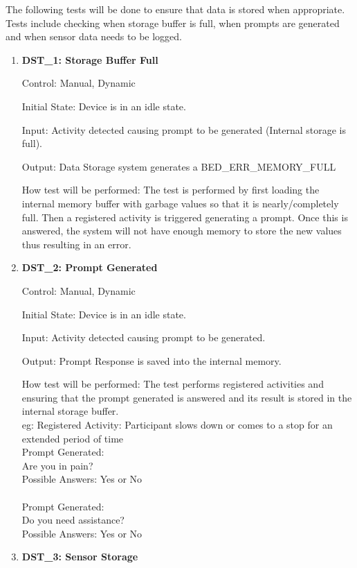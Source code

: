 \documentclass[12pt, titlepage]{article}
\begin{document}
The following tests will be done to ensure that data is stored when appropriate. Tests include checking when storage buffer is full, when prompts are generated and when sensor data needs to be logged. 
\begin{enumerate}
	\item{\textbf{DST\_1: Storage Buffer Full} \\}\label{DST1}
	
		Control: Manual, Dynamic
							
		Initial State: Device is in an idle state.
							
		Input: Activity detected causing prompt to be generated (Internal storage is full).
		
		Output: Data Storage system generates a BED\_ERR\_MEMORY\_FULL
		
		How test will be performed: The test is performed by first loading the internal memory buffer with garbage values so that it is nearly/completely full. Then a registered activity is triggered generating a 					prompt. Once this is answered, the system will not have enough memory to store the new values thus resulting in an error.

	\item{\textbf{DST\_2: Prompt Generated} \\}\label{DST2}
	
		Control: Manual, Dynamic
							
		Initial State: Device is in an idle state.
							
		Input: Activity detected causing prompt to be generated.
		
		Output: Prompt Response is saved into the internal memory.
		
		How test will be performed: The test performs registered activities and ensuring that the prompt generated is answered and its result is stored in the internal storage buffer.\\
		eg: Registered Activity: Participant slows down or comes to a stop for an extended period of time\\
		Prompt Generated: \\
		Are you in pain?\\
		Possible Answers: Yes or No\\
		\\
		Prompt Generated: \\
		Do you need assistance?\\
		Possible Answers: Yes or No\\
\pagebreak
	\item{\textbf{DST\_3: Sensor Storage} \\}\label{DST3}
	

\end{enumerate}
\end{document}
